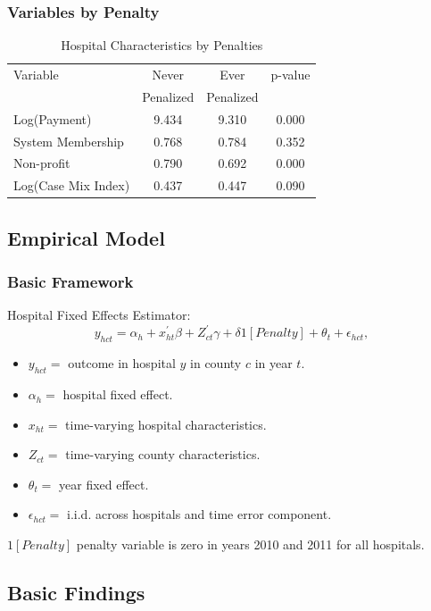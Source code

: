 \documentclass[ucs,9pt]{beamer}
\begin{document}
\begin{frame}
\frametitle{Variables by Penalty}

\begin{table}[htp]
\centering \normalsize
\caption{Hospital Characteristics by Penalties}
\label{tab:hosp}
\begin{tabular}{lccc}
\hline \hline
Variable 	& Never 				& Ever  				& p-value  	  \\
		   		&  Penalized    		& Penalized			&       				\\
 \hline
Log(Payment)	&	9.434	&	9.310	&	0.000	\\
System  Membership      	&	0.768	&	0.784	&	0.352	\\
Non-profit     	&	0.790	&	0.692	&	0.000	\\
Log(Case Mix Index)        	&	0.437	&	0.447	&	0.090	\\
\hline
\end{tabular}
\end{table}
\end{frame}





\subsection{Empirical Model}
\begin{frame}
\frametitle{Basic Framework}
Hospital Fixed Effects Estimator: 
\begin{equation}
\label{eq: reg}
y_{hct} = \alpha_{h} + x^{'}_{ht}\beta +  Z^{'}_{ct}\gamma+ \delta1[Penalty]  + \theta_{t}  +  \epsilon_{hct},
\end{equation}
\begin{itemize}
\item $y_{hct} =$ outcome in hospital $y$ in county $c$ in year $t$.
\item $\alpha_{h}=$ hospital fixed effect.
\item $x_{ht}=$ time-varying hospital characteristics.
\item $Z_{ct}=$ time-varying county characteristics.
\item $\theta_{t}=$ year fixed effect.
\item $\epsilon_{hct}=$ i.i.d. across hospitals and time error component.
\end{itemize}
$1[Penalty]$  penalty variable is zero in years 2010 and 2011 for all hospitals.
\end{frame}


\subsection{Basic Findings}
\end{document}
